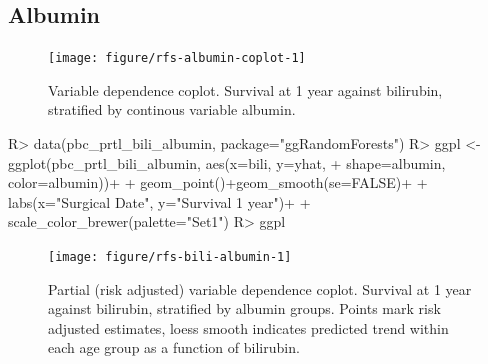 \documentclass[nojss]{jss}\usepackage[]{graphicx}\usepackage[]{color}
\begin{document}
\subsection{Albumin}
\begin{Schunk}
\begin{figure}[!htpb]

{\centering \texttt{[image: figure/rfs-albumin-coplot-1]} 

}

\caption[Variable dependence coplot]{Variable dependence coplot. Survival at 1 year against bilirubin, stratified by continous variable albumin.\label{fig:albumin-coplot}}
\end{figure}
\end{Schunk}


\begin{Schunk}
\begin{Sinput}
R> data(pbc_prtl_bili_albumin, package="ggRandomForests")
R> ggpl <- ggplot(pbc_prtl_bili_albumin, aes(x=bili, y=yhat, 
+                                           shape=albumin, color=albumin))+
+   geom_point()+geom_smooth(se=FALSE)+
+   labs(x="Surgical Date", y="Survival 1 year")+
+   scale_color_brewer(palette="Set1")
R> ggpl
\end{Sinput}
\begin{figure}[!htpb]

{\centering \texttt{[image: figure/rfs-bili-albumin-1]} 

}

\caption[Partial (risk adjusted) variable dependence coplot]{Partial (risk adjusted) variable dependence coplot. Survival at 1 year against bilirubin, stratified by albumin groups. Points mark risk adjusted estimates, loess smooth indicates predicted trend within each age group as a function of bilirubin.\label{fig:bili-albumin}}
\end{figure}
\end{Schunk}
\end{document}
